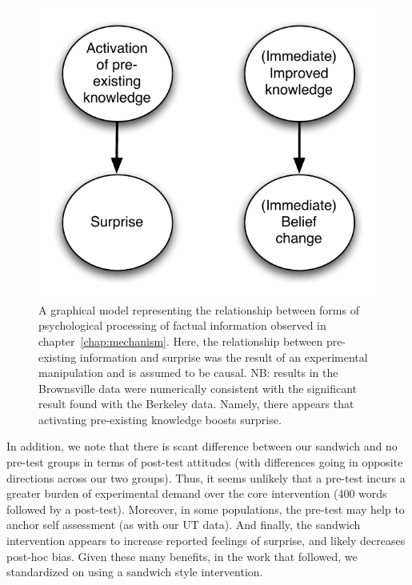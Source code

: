 \begin{figure}
    \begin{center}
        \includegraphics{causal2.pdf}
    \end{center}
    \caption{A graphical model representing the relationship between forms of
        psychological processing of factual information observed in
        chapter~\ref{chap:mechanism}. Here, the relationship between
        pre-existing information and surprise was the result of an experimental
        manipulation and is assumed to be causal. NB: results in the Brownsville
        data were numerically consistent with the significant result found with
        the Berkeley data. Namely, there appears that activating pre-existing
        knowledge boosts surprise.}
    \label{fig:causal-mechanism}
\end{figure}

In addition, we note that there is scant difference between our sandwich and no
pre-test groups in terms of post-test attitudes (with differences going in
opposite directions across our two groups). Thus, it seems unlikely that a
pre-test incurs a greater burden of experimental demand over the core
intervention (400 words followed by a post-test). Moreover, in some populations,
the pre-test may help to anchor self assessment (as with our UT data). And
finally, the sandwich intervention appears to increase reported feelings of
surprise, and likely decreases post-hoc bias. Given these many benefits, in the
work that followed, we standardized on using a sandwich style intervention.

